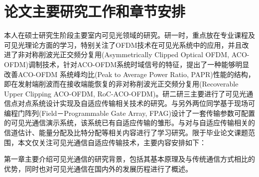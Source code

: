 \section{论文主要研究工作和章节安排}\label{sec:concept}
本人在硕士研究生阶段主要室内可见光领域的研究。研一时，重点放在专业课程及可见光理论方面的学习，特别关注了OFDM技术在可见光系统中的应用，并且改进了非对称削波光正交频分复用(Asymmetrically Clipped Optical OFDM, ACO-OFDM)调制技术，针对ACO-OFDM系统时域信号的特征，提出了一种能够明显改善ACO-OFDM 系统峰均比(Peak to Average Power Ratio, PAPR)性能的结构，即在发射端削波而在接收端能恢复的非对称削波光正交频分复用(Recoverable Upper Clipping ACO-OFDM, RoC-ACO-OFDM)\cite{xu2014aco}。研二研三主要进行了可见光通信点对点系统设计实现及自适应传输相关技术的研究。与另外两位同学基于现场可编程门阵列(Field－Programmable Gate Array, FPAG)设计了一套传输参数可配置的可见光通信演示系统，该系统已有自适应传输的雏形。与对与自适应传输相关的信道估计、能量分配及比特分配等相关内容进行了学习研究。限于毕业论文课题范围，本文仅关注可见光通信自适应传输技术，主要内容安排如下：

第一章主要介绍可见光通信的研究背景，包括其基本原理及与传统通信方式相比的优势，同时也对可见光通信在国内外的发展历程进行了概述。

